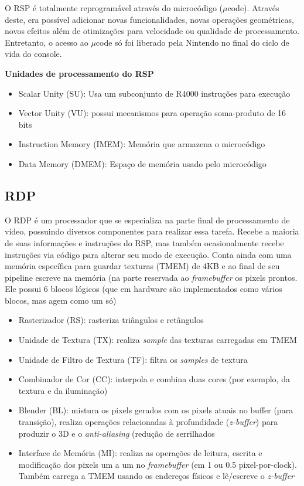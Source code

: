 \documentclass[12pt]{article}
\begin{document}
O RSP é totalmente reprogramável através do microcódigo ($\mu$code). Através
deste, era possível adicionar novas funcionalidades, novas operações
geométricas, novos efeitos além de otimizações para velocidade ou qualidade
de processamento. Entretanto, o acesso ao $\mu$code só foi liberado pela
Nintendo no final do ciclo de vida do console.

\textbf{Unidades de processamento do RSP}

\begin{itemize}
    \item Scalar Unity (SU): Usa um subconjunto de R4000 instruções para execução
    \item Vector Unity (VU): possui mecanismos para operação soma-produto de 16 bits
    \item Instruction Memory (IMEM): Memória que armazena o microcódigo
    \item Data Memory (DMEM): Espaço de memória usado pelo microcódigo
\end{itemize}




\subsection{RDP}
O RDP é um processador que se especializa na parte final de processamento de vídeo, possuindo diversos componentes para realizar essa tarefa. Recebe a maioria de suas informações e instruções do RSP, mas também ocasionalmente recebe instruções via código para alterar seu modo de execução. Conta ainda com uma memória específica para guardar texturas (TMEM) de 4KB e ao final de seu pipeline escreve na memória (na parte reservada ao \textit{framebuffer} os pixels prontos. Ele possui 6 blocos lógicos (que em hardware são implementados como vários blocos, mas agem como um só)
\begin{itemize}
    \item{Rasterizador (RS): rasteriza triângulos e retângulos}
    \item{Unidade de Textura (TX): realiza \textit{sample} das texturas carregadas em TMEM}
    \item{Unidade de Filtro de Textura (TF): filtra os \textit{samples} de textura}
    \item{Combinador de Cor (CC): interpola e combina duas cores (por exemplo, da textura e da iluminação)}
    \item{Blender (BL): mistura os pixels gerados com os pixels atuais no buffer (para transição), realiza operações relacionadas à profundidade (\textit{z-buffer}) para produzir o 3D e o \textit{anti-aliasing} (redução de serrilhados}
    \item{Interface de Memória (MI): realiza as operações de leitura, escrita e modificação dos pixels um a um no \textit{framebuffer} (em 1 ou 0.5 pixel-por-clock). Também carrega a TMEM usando os endereços físicos e lê/escreve o \textit{z-buffer}}
\end{itemize}
\end{document}
